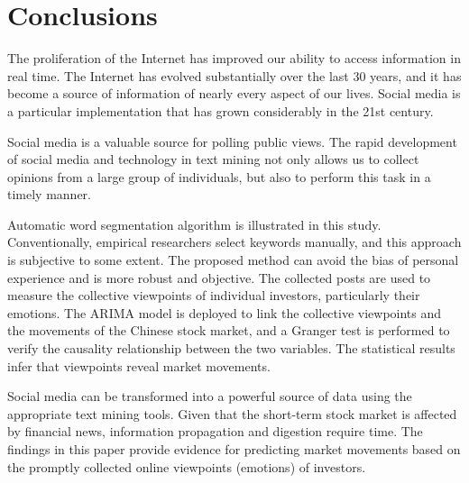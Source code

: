 \documentclass[review,3p,times,12pt,number]{elsarticle}
\begin{document}
\section{Conclusions}
\label{sec:weibo:conclude}
The proliferation of the Internet has improved our ability to access information in real time. The Internet has evolved substantially over the last 30 years, and it has become a source of information of nearly every aspect of our lives. Social media is a particular implementation that has grown considerably in the 21st century.

Social media is a valuable source for polling public views. The rapid development of social media and technology in text mining not only allows us to collect opinions from a large group of individuals, but also to perform this task in a timely manner.

Automatic word segmentation algorithm is illustrated in this study. Conventionally, empirical researchers select keywords manually, and this approach is subjective to some extent. The proposed method can avoid the bias of personal experience and is more robust and objective. The collected posts are used to measure the collective viewpoints of individual investors, particularly their emotions. The ARIMA model is deployed to link the collective viewpoints and the movements of the Chinese stock market, and a Granger test is performed to verify the causality relationship between the two variables. The statistical results infer that viewpoints reveal market movements.

Social media can be transformed into a powerful source of data using the appropriate text mining tools. Given that the short-term stock market is affected by financial news, information propagation and digestion require time. The findings in this paper provide evidence for predicting market movements based on the promptly collected online viewpoints (emotions) of investors.


%




\end{document}
